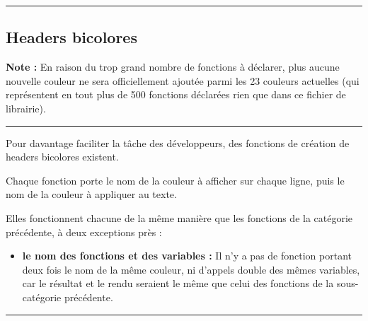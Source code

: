 \documentclass[a4paper,10pt]{article}
\begin{document}


\color{green}\par\noindent\rule{\textwidth}{0.4pt}\color{white}

\color{green}
\subsection{Headers bicolores}\color{white}

\begin{justify}
    \textbf{Note :} En raison du trop grand nombre de fonctions à déclarer, plus aucune nouvelle couleur ne sera officiellement ajoutée parmi les 23 couleurs actuelles (qui représentent en tout plus de 500 fonctions déclarées rien que dans ce fichier de librairie).
\end{justify}

\par\noindent\rule{\textwidth}{0.4pt}

\begin{justify}
    Pour davantage faciliter la tâche des développeurs, des fonctions de création de headers bicolores existent.
\end{justify}

\begin{justify}
    Chaque fonction porte le nom de la couleur à afficher sur chaque ligne, puis le nom de la couleur à appliquer au texte.
\end{justify}

\begin{justify}
    Elles fonctionnent chacune de la même manière que les fonctions de la catégorie précédente, à deux exceptions près :

    \begin{itemize}
        \item \textbf{le nom des fonctions et des variables :} Il n'y a pas de fonction portant deux fois le nom de la même couleur, ni d'appels double des mêmes variables, car le résultat et le rendu seraient le même que celui des fonctions de la sous-catégorie précédente.\setlength{\parskip}{1em}
    \end{itemize}
\end{justify}




\color{green}\par\noindent\rule{\textwidth}{0.4pt}\color{white}
\end{document}

